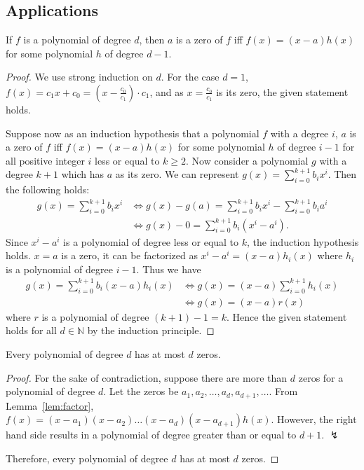 \documentclass[../main.tex]{subfiles}
\begin{document}
\subsection{Applications}
\begin{lem} \label{lem:factor}
    If $f$ is a polynomial of degree $d$, then $a$ is a zero of $f$ iff $f(x) = (x - a) h(x)$ for some polynomial $h$ of degree $d - 1$.
\end{lem}
\begin{proof}
    We use strong induction on $d$.
    For the case $d = 1$, $f(x) = c_1 x + c_0 = \left(x - \frac{c_0}{c_1}\right) \cdot c_1$, and as $x = \frac{c_0}{c_1}$ is its zero, the given statement holds.

    Suppose now as an induction hypothesis that a polynomial $f$ with a degree $i$, $a$ is a zero of $f$ iff $f(x) = (x-a) h(x)$ for some polynomial $h$ of degree $i-1$ for all positive integer $i$ less or equal to $k \geq 2$.
    Now consider a polynomial $g$ with a degree $k+1$ which has $a$ as its zero.
    We can represent $g(x) = \sum_{i = 0}^{k+1} b_i x^i$.
    Then the following holds:
    \begin{align*}
        g(x) = \sum_{i = 0}^{k+1} b_i x^i &\Leftrightarrow g(x) - g(a) = \sum_{i=0}^{k+1} b_i x^i -  \sum_{i=0}^{k+1} b_i a^i\\
                                          &\Leftrightarrow g(x) - 0 = \sum^{k+1}_{i=0} b_i (x^i - a^i).
    \end{align*}
    Since $x^i - a^i$ is a polynomial of degree less or equal to $k$, the induction hypothesis holds.
    $x = a$ is a zero, it can be factorized as $x^i - a^i = (x-a) h_i(x)$ where $h_i$ is a polynomial of degree $i-1$.
    Thus we have
    \begin{align*}
        g(x) = \sum^{k+1}_{i=0} b_i (x - a)h_i(x) &\Leftrightarrow g(x) = (x - a) \sum^{k+1}_{i=0} h_i(x)\\
                                                  &\Leftrightarrow g(x) = (x - a) r(x)
    \end{align*}
    where $r$ is a polynomial of degree $(k+1) - 1 = k$.
    Hence the given statement holds for all $d \in \mathbb N$ by the induction principle.
\end{proof}

\begin{thm}
    Every polynomial of degree $d$ has at most $d$ zeros.
\end{thm}
\begin{proof}
    For the sake of contradiction, suppose there are more than $d$ zeros for a polynomial of degree $d$.
    Let the zeros be $a_1, a_2, \dots, a_d, a_{d+1}, \dots$.
    From Lemma~\ref{lem:factor}, $f(x) = (x - a_1)(x - a_2) \dots (x - a_d) (x - a_{d+1}) h(x)$.
    However, the right hand side results in a polynomial of degree greater than or equal to $d+1$. $\lightning$

    Therefore, every polynomial of degree $d$ has at most $d$ zeros.
\end{proof}
\end{document}
